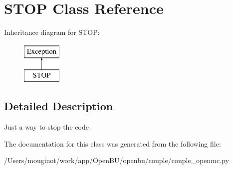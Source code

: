 \hypertarget{classopenbu_1_1couple_1_1couple__openmc_1_1_s_t_o_p}{}\section{S\+T\+OP Class Reference}
\label{classopenbu_1_1couple_1_1couple__openmc_1_1_s_t_o_p}
Inheritance diagram for S\+T\+OP\+:\begin{figure}[H]
\begin{center}
\leavevmode
\includegraphics[height=2.000000cm]{classopenbu_1_1couple_1_1couple__openmc_1_1_s_t_o_p}
\end{center}
\end{figure}


\subsection{Detailed Description}
\begin{DoxyVerb}Just a way to stop the code\end{DoxyVerb}
 

The documentation for this class was generated from the following file\+:\begin{DoxyCompactItemize}
\item 
/\+Users/mouginot/work/app/\+Open\+B\+U/openbu/couple/couple\+\_\+openmc.\+py\end{DoxyCompactItemize}
